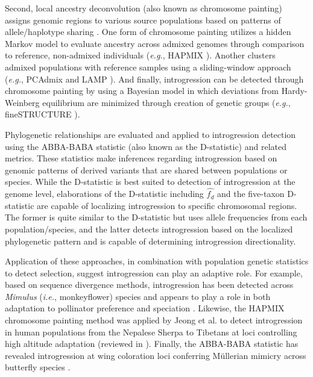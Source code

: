 \documentclass[11pt]{article}
\begin{document}
Second, local ancestry deconvolution (also known as chromosome painting) assigns genomic regions to various source populations based on patterns of allele/haplotype sharing \cite{schraiber2015}. 
One form of chromosome painting utilizes a hidden Markov model to evaluate ancestry across admixed genomes through comparison to reference, non-admixed individuals (\emph{e.g.}, HAPMIX \cite{Price2009}). 
Another clusters admixed populations with reference samples using a sliding-window approach (\emph{e.g.}, PCAdmix \cite{brisbin2012pcadmix} and LAMP \cite{sankararaman2008}).
And finally, introgression can be detected through chromosome painting by using a Bayesian model \cite{pritchard2000} in which deviations from Hardy-Weinberg equilibrium are minimized through creation of genetic groups (\emph{e.g.}, fineSTRUCTURE \cite{Lawson2012}). 


Phylogenetic relationships are evaluated and applied to introgression detection using the ABBA-BABA statistic (also known as the D-statistic) and related metrics.
These statistics make inferences regarding introgression based on genomic patterns of derived variants that are shared between populations or species.
While the D-statistic is best suited to detection of introgression at the genome level, elaborations of the D-statistic including $\hat{f_{d}}$ \cite{martin2015} and the five-taxon D-statistic \cite{pease2015} are capable of localizing introgression to specific chromosomal regions. 
The former is quite similar to the D-statistic but uses allele frequencies from each population/species, and the latter detects introgression based on the localized phylogenetic pattern and is capable of determining introgression directionality.


Application of these approaches, in combination with population genetic statistics to detect selection, suggest introgression can play an adaptive role.
For example, based on sequence divergence methods, introgression has been detected across \emph{Mimulus} (\emph{i.e.}, monkeyflower) species and appears to play a role in both adaptation to pollinator preference and speciation \cite{Stankowski2015}.
Likewise, the HAPMIX chromosome painting method was applied by Jeong et al. \cite{jeong2014} to detect introgression in human populations from the Nepalese Sherpa to Tibetans at loci controlling high altitude adaptation (reviewed in \cite{Racimo2015}).
Finally, the ABBA-BABA statistic has revealed introgression at wing coloration loci conferring M\"{u}llerian mimicry across butterfly species \cite{heliconius2012}.
\end{document}
